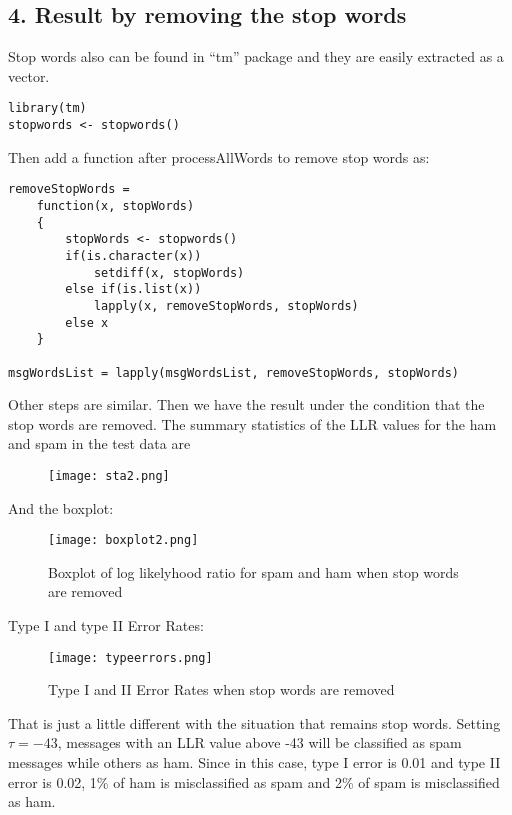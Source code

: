 \documentclass{article}
\begin{document}
\subsection*{4. Result by removing the stop words}
Stop words also can be found in ``tm'' package and they are easily extracted as a vector.
\begin{verbatim}
library(tm)
stopwords <- stopwords()
\end{verbatim}
Then add a function after processAllWords to remove stop words as:
\begin{verbatim}
removeStopWords =
    function(x, stopWords)
    {
        stopWords <- stopwords()
        if(is.character(x))
            setdiff(x, stopWords)
        else if(is.list(x))
            lapply(x, removeStopWords, stopWords)
        else x
    }

msgWordsList = lapply(msgWordsList, removeStopWords, stopWords)  
\end{verbatim}

Other steps are similar. Then we have the result under the condition that the stop words are removed. The summary statistics of the LLR values for the ham and spam in the test data are
\begin{figure}[H] 
\begin{center} 
\texttt{[image: sta2.png]}  
\label{spd} 
\end{center} 
\end{figure}
And the boxplot: 
\begin{figure}[H] 
\begin{center} 
\texttt{[image: boxplot2.png]}  
\caption{Boxplot of log likelyhood ratio for spam and ham when stop words are removed} 
\label{spd} 
\end{center} 
\end{figure}
Type I and type II Error Rates:
\begin{figure}[H] 
\begin{center} 
\texttt{[image: typeerrors.png]}  
\caption{Type I and II Error Rates when stop words are removed} 
\label{spd} 
\end{center} 
\end{figure}
That is just a little different with the situation that remains stop words. Setting $\tau =-43$, messages with an LLR value above -43 will be classified as spam messages while others as ham. Since in this case, type I error is 0.01 and type II error is 0.02, 1\% of ham is misclassified as spam and 2\% of spam is misclassified as ham.
\end{document}
